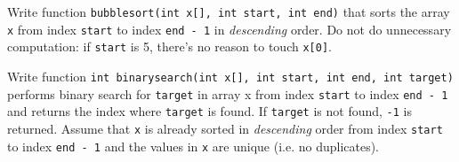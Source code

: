 

\nextq
Write function \verb!bubblesort(int x[], int start, int end)!
that sorts the array \verb!x! from index \verb!start! to index \verb!end - 1!
in \textit{descending} order.
Do not do unnecessary computation: if \verb!start! is 5, there's no
reason to touch \verb!x[0]!.
\\
\ANSWER
\begin{answercode}

\end{answercode}

\nextq
Write function \verb!int binarysearch(int x[], int start, int end, int target)!
performs binary search for \verb!target! in array x
from index \verb!start! to index \verb!end - 1! and
returns the index where \verb!target! is found.
If \verb!target! is not found, \verb!-1! is returned.
Assume that \verb!x! is already sorted in \textit{descending} order
from index \verb!start! to index \verb!end - 1!
and the values in \verb!x! are unique (i.e. no duplicates).
\\
\ANSWER
\begin{answercode}

\end{answercode}


